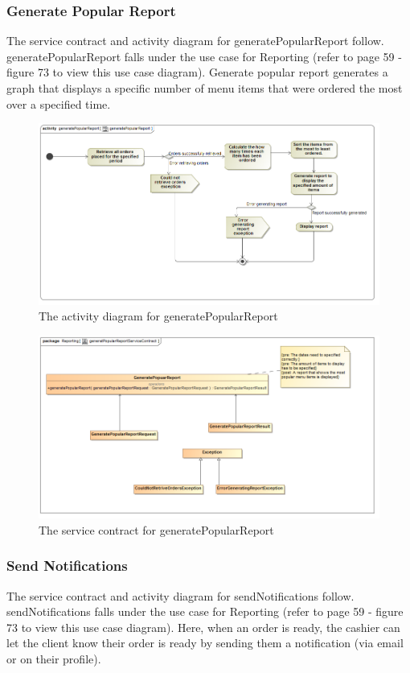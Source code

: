 \documentclass[a4paper,12pt]{report}
\begin{document}
\subsubsection{Generate Popular Report}
The service contract and activity diagram for generatePopularReport follow. generatePopularReport falls under the use case for Reporting (refer to page 59 - figure 73 to view this use case diagram). Generate popular report generates a graph that displays a specific number of menu items that were ordered the most over a specified time.
\begin{figure}[H]
 \centering
  \includegraphics[width=1.0\textwidth]{../images/generatePopularReportActivityDiagram.png}
    \caption{The activity diagram for generatePopularReport}
    \end{figure}
    
    \begin{figure}[H]
  \centering
    \includegraphics[width=1.0\textwidth]{../images/generatPopularReportServiceContract.png}
    \caption{The service contract for generatePopularReport} 
\end{figure}


\subsubsection{Send Notifications}
The service contract and activity diagram for sendNotifications follow. sendNotifications falls under the use case for Reporting (refer to page 59 - figure 73  to view this use case diagram). Here, when an order is ready, the cashier can let the client know their order is ready by sending them a notification (via email or on their profile).
\end{document}
